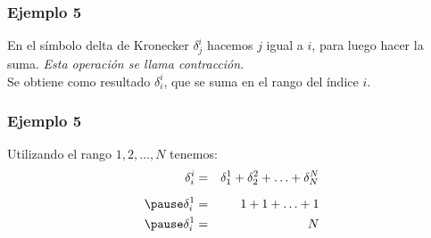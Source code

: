 \documentclass[12pt]{beamer}
\begin{document}
\begin{frame}
\frametitle{Ejemplo 5}
En el símbolo delta de Kronecker $\delta_{j}^{i}$ hacemos $j$ igual a $i$, para luego hacer la suma. \emph{Esta operación se llama contracción}.
\\
\bigskip
\pause
Se obtiene como resultado $\delta_{i}^{i}$, que se suma en el rango del índice $i$.
\end{frame}
\begin{frame}
\frametitle{Ejemplo 5}
Utilizando el rango $1, 2, \ldots, N$ tenemos:
\begin{eqnarray*}
\delta_{i}^{i} &=& \delta_{1}^{1} + \delta_{2}^{2} + \ldots + \delta_{N}^{N} \\[0.5em] \pause
\delta_{i}^{1} &=& 1 + 1 + \ldots +  1 \\[0.em] \pause
\delta_{i}^{1} &=& N
\end{eqnarray*}
\end{frame}
\end{document}
